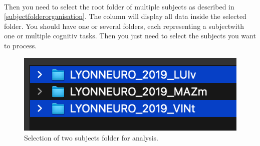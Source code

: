 \documentclass[a4paper]{article}
\begin{document}
\paragraph{} Then you need to select the root folder of multiple subjects as described in \ref{subjectfolderorganisation}. The column will display all data inside the selected folder. You should have one or several folders,  each representing a subjectwith one or multiple cognitiv tasks. Then you just need to select the subjects you want to process.
\begin{figure}[H]
\begin{center}
\includegraphics[scale=0.8]{MultipleSubjectsFolderSelect.png}
\end{center}
\caption{\label{MultipleSubjectsFolderSelectionUI}Selection of two subjects folder for analysis.}
\end{figure}
\end{document}
